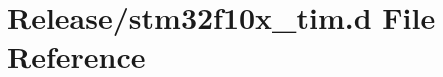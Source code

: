 \hypertarget{stm32f10x__tim_8d}{}\section{Release/stm32f10x\+\_\+tim.d File Reference}
\label{stm32f10x__tim_8d}
